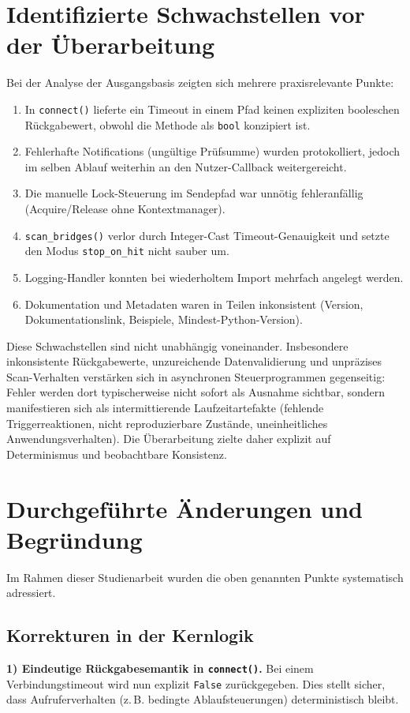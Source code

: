 \section{Identifizierte Schwachstellen vor der Überarbeitung}
Bei der Analyse der Ausgangsbasis zeigten sich mehrere praxisrelevante Punkte:
\begin{enumerate}
	\item In \texttt{connect()} lieferte ein Timeout in einem Pfad keinen expliziten booleschen Rückgabewert, obwohl die Methode als \texttt{bool} konzipiert ist.
	\item Fehlerhafte Notifications (ungültige Prüfsumme) wurden protokolliert, jedoch im selben Ablauf weiterhin an den Nutzer-Callback weitergereicht.
	\item Die manuelle Lock-Steuerung im Sendepfad war unnötig fehleranfällig (Acquire/Release ohne Kontextmanager).
	\item \texttt{scan\_bridges()} verlor durch Integer-Cast Timeout-Genauigkeit und setzte den Modus \texttt{stop\_on\_hit} nicht sauber um.
	\item Logging-Handler konnten bei wiederholtem Import mehrfach angelegt werden.
	\item Dokumentation und Metadaten waren in Teilen inkonsistent (Version, Dokumentationslink, Beispiele, Mindest-Python-Version).
\end{enumerate}

Diese Schwachstellen sind nicht unabhängig voneinander.
Insbesondere inkonsistente Rückgabewerte, unzureichende Datenvalidierung und unpräzises Scan-Verhalten verstärken sich in asynchronen Steuerprogrammen gegenseitig:
Fehler werden dort typischerweise nicht sofort als Ausnahme sichtbar, sondern manifestieren sich als intermittierende Laufzeitartefakte (fehlende Triggerreaktionen, nicht reproduzierbare Zustände, uneinheitliches Anwendungsverhalten).
Die Überarbeitung zielte daher explizit auf Determinismus und beobachtbare Konsistenz.

\section{Durchgeführte Änderungen und Begründung}
Im Rahmen dieser Studienarbeit wurden die oben genannten Punkte systematisch adressiert.

\subsection{Korrekturen in der Kernlogik}
\textbf{1) Eindeutige Rückgabesemantik in \texttt{connect()}.}
Bei einem Verbindungstimeout wird nun explizit \texttt{False} zurückgegeben.
Dies stellt sicher, dass Aufruferverhalten (z.\,B. bedingte Ablaufsteuerungen) deterministisch bleibt.

